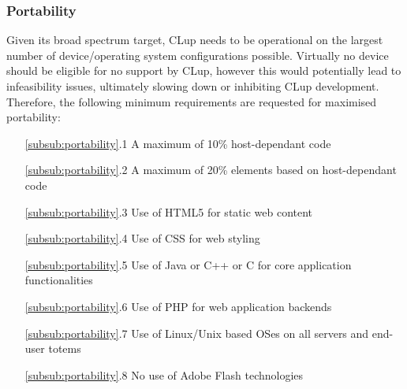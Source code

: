 \subsubsection{Portability \label{subsub:portability}}
Given its broad spectrum target, CLup needs to be operational on the largest number of device/operating system configurations possible. Virtually no device should be eligible for no support by CLup, however this would potentially lead to infeasibility issues, ultimately slowing down or inhibiting CLup development. \newline
Therefore, the following minimum requirements are requested for maximised portability:\newline
\begin{itemize}[leftmargin=+.8in]
    \item[\ref{subsub:portability}.1] A maximum of 10\% host-dependant code
    \item[\ref{subsub:portability}.2] A maximum of 20\% elements based on host-dependant code
    \item[\ref{subsub:portability}.3] Use of HTML5 for static web content
    \item[\ref{subsub:portability}.4] Use of CSS for web styling
    \item[\ref{subsub:portability}.5] Use of Java or C++ or C for core application functionalities
    \item[\ref{subsub:portability}.6] Use of PHP for web application backends
    \item[\ref{subsub:portability}.7] Use of Linux/Unix based OSes on all servers and end-user totems
    \item[\ref{subsub:portability}.8] No use of Adobe \textregistered \space Flash \textregistered \space technologies
\end{itemize}

